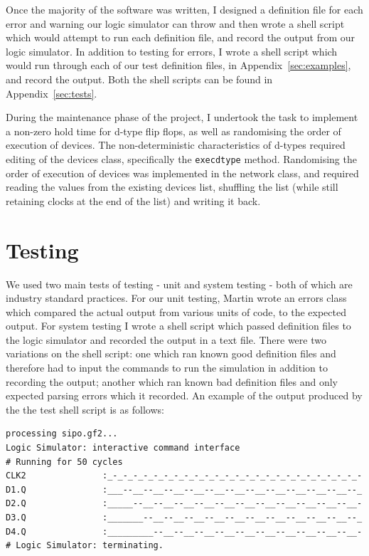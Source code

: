 \documentclass[a4paper,10pt]{article}
\begin{document}
Once the majority of the software was written, I designed a definition file for each error and warning our logic simulator can throw and then wrote a shell script which would attempt to run each definition file, and record the output from our logic simulator. In addition to testing for errors, I wrote a shell script which would run through each of our test definition files, in Appendix~\ref{sec:examples}, and record the output. Both the shell scripts can be found in Appendix~\ref{sec:tests}.

During the maintenance phase of the project, I undertook the task to implement a non-zero hold time for d-type flip flops, as well as randomising the order of execution of devices. The non-deterministic characteristics of d-types required editing of the devices class, specifically the \texttt{execdtype} method. Randomising the order of execution of devices was implemented in the network class, and required reading the values from the existing devices list, shuffling the list (while still retaining clocks at the end of the list) and writing it back.

\section{Testing}

We used two main tests of testing - unit and system testing - both of which are industry standard practices. For our unit testing, Martin wrote an errors class which compared the actual output from various units of code, to the expected output. For system testing I wrote a shell script which passed definition files to the logic simulator and recorded the output in a text file. There were two variations on the shell script: one which ran known good definition files and therefore had to input the commands to run the simulation in addition to recording the output; another which ran known bad definition files and only expected parsing errors which it recorded. An example of the output produced by the the test shell script is as follows:

\begin{verbatim}
processing sipo.gf2...
Logic Simulator: interactive command interface
# Running for 50 cycles
CLK2               :_-_-_-_-_-_-_-_-_-_-_-_-_-_-_-_-_-_-_-_-_-_-_-_-_-
D1.Q               :___--__--__--__--__--__--__--__--__--__--__--__--_
D2.Q               :_____--__--__--__--__--__--__--__--__--__--__--__-
D3.Q               :_______--__--__--__--__--__--__--__--__--__--__--_
D4.Q               :_________--__--__--__--__--__--__--__--__--__--__-
# Logic Simulator: terminating.
\end{verbatim}
\end{document}
